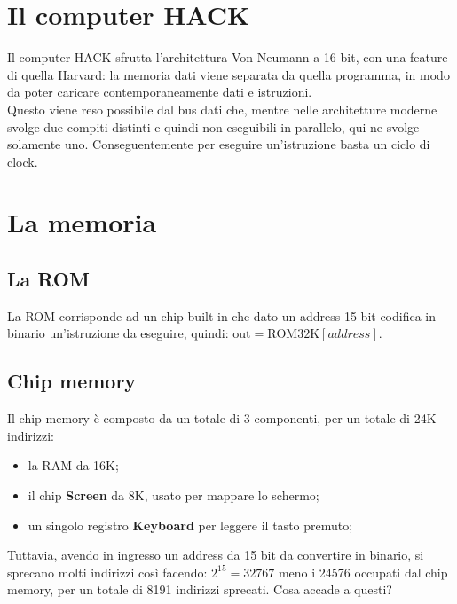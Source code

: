 \documentclass[12pt]{article}
\begin{document}
\section{Il computer HACK}
\label{sec:premises}
Il computer HACK sfrutta l'architettura Von Neumann a 16-bit, con una feature di quella Harvard:
la memoria dati viene separata da quella programma, in modo da poter caricare contemporaneamente dati e istruzioni.
\\
Questo viene reso possibile dal bus dati che, mentre nelle architetture moderne svolge due compiti distinti e quindi non eseguibili in parallelo, qui ne svolge solamente uno.
Conseguentemente per eseguire un'istruzione basta un ciclo di clock.

\section{La memoria}
\label{sec:memory}

\subsection{La ROM}
\label{ssec:ROM}
La ROM corrisponde ad un chip built-in che dato un address 15-bit codifica in binario
un'istruzione da eseguire, quindi: $\text{out} = \text{ROM}32\text{K}[address]$.

\subsection{Chip memory}
\label{ssec:memory_chip}
Il chip memory è composto da un totale di 3 componenti, per un totale di 24K indirizzi:
\begin{itemize}
    \item la RAM da 16K;
    \item il chip \textbf{Screen} da 8K, usato per mappare lo schermo;
    \item un singolo registro \textbf{Keyboard} per leggere il tasto premuto;
\end{itemize} 
Tuttavia, avendo in ingresso un address da 15 bit da convertire in binario, si sprecano molti indirizzi così facendo: $2^{15}=32767$ meno i 24576 occupati dal chip memory, per un totale di 8191 indirizzi sprecati. Cosa accade a questi?
\end{document}
